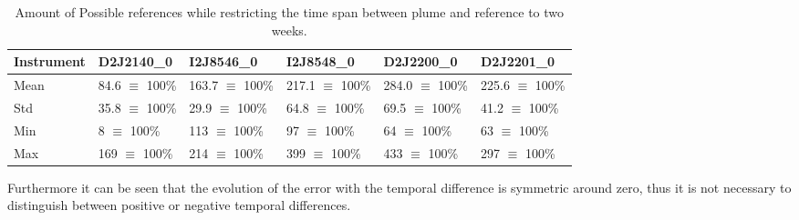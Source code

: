 \documentclass  [
  paper    = a4,
  BCOR     = 10mm,
  twoside,
  fontsize = 12pt,
  fleqn,
  toc      = bibnumbered,
  toc      = listofnumbered,
  numbers  = noendperiod,
  headings = normal,
  listof   = leveldown,
  version  = 3.03
]                                       {scrreprt}
\begin{document}
	\begin{table}[h]
		\begin{tabular}{|p{2cm}|p{2cm}|p{2cm}|p{2cm}|p{2cm}|p{2cm}|}
			Instrument	&D2J2140\_0&I2J8546\_0& I2J8548\_0&D2J2200\_0&D2J2201\_0\\
			\toprule
			Mean&84.6 $\equiv$ 100\%&163.7 $\equiv$ 100\%&217.1 $\equiv$ 100\%&284.0 $\equiv$ 100\%&225.6 $\equiv$ 100\%\\
			\midrule
			Std&
			35.8 $\equiv$ 100\%&
			29.9 $\equiv$ 100\%&
			64.8 $\equiv$ 100\%&
			69.5 $\equiv$ 100\%&
			41.2 $\equiv$ 100\%\\
			\midrule
			Min&
			8 $\equiv$ 100\%&
			113 $\equiv$ 100\%&
			97 $\equiv$ 100\%&
			64 $\equiv$ 100\% &
			63 $\equiv$ 100\%\\
			\midrule
			Max&
			169 $\equiv$ 100\%&
			214 $\equiv$ 100\%
			&399 $\equiv$ 100\%
			&433  $\equiv$ 100\%
			&297 $\equiv$ 100\% \\
			\bottomrule
		\end{tabular}
	\caption{Amount of Possible references while restricting the time span between plume and reference to two weeks.}
	\label{Tab:refstime}
	\end{table}	

	Furthermore it can be seen that the evolution of the   error with the temporal difference is symmetric around zero, thus it is not necessary to distinguish between positive or negative temporal differences.\\

	
\end{document}
